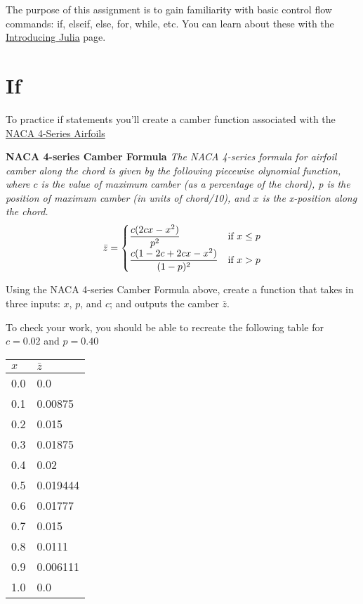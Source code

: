 \documentclass{article}%
\begin{document}
	
	The purpose of this assignment is to gain familiarity with basic control flow commands: if, elseif, else, for, while, etc. You can learn about these with the \href{https://en.wikibooks.org/wiki/Introducing_Julia/Controlling_the_flow}{Introducing Julia} page.
	
	\section{If}
	To practice if statements you'll create a camber function associated with the \href{https://en.wikipedia.org/wiki/NACA_airfoil}{NACA 4-Series Airfoils} 
	
	\bigskip
	
	\begin{tcolorbox}
		\textbf{
			NACA 4-series Camber Formula
		} 
		\textit{
			The NACA 4-series formula for airfoil camber along the chord is given by the following piecewise olynomial function, where $c$ is the value of maximum camber (as a percentage of the chord), p is the position of maximum camber (in units of chord/10), and $x$ is the x-position along the chord.
		}
		\begin{align*}
		\bar{z} = 
		\begin{cases}
		\qfrac{c(2cx-x^2)}{p^2} &\text{if  } x \leq p\\
		\qfrac{c(1-2c +2cx - x^2)}{(1-p)^2} &\text{if  } x > p
		\end{cases}
		\end{align*}
		
	\end{tcolorbox}
	
	\bigskip
	
	Using the NACA 4-series Camber Formula above, create a function that takes in three inputs: $x$, $p$, and $c$; and outputs the camber $\bar{z}$.
	
	To check your work, you should be able to recreate the following table for $c=0.02$ and $p=0.40$
	
	\renewcommand{\arraystretch}{1.2}
	\begin{tabular}{ l | l }
		$x$ & $\bar{z}$ \\
		\hline
		0.0 & 0.0\\
		0.1 & 0.00875\\
		0.2 & 0.015\\
		0.3 & 0.01875\\
		0.4 & 0.02\\
		0.5 & 0.019444\\
		0.6 & 0.01777\\
		0.7 & 0.015\\
		0.8 & 0.0111\\
		0.9 & 0.006111\\
		1.0 & 0.0\\
	\end{tabular}
	
\end{document}
